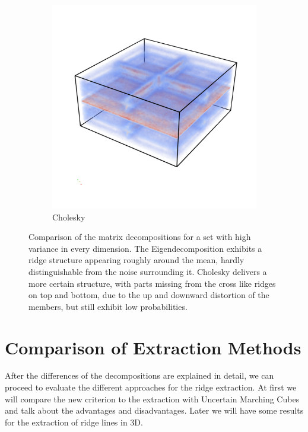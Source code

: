 \begin{figure}
\begin{subfigure}[b]{0.49\textwidth}
        \includegraphics[trim=0 350 0 300, clip=true, width=\textwidth]{Images/highuncChol.png}
        \caption{Cholesky}
        \label{fig:HUCchol}
    \end{subfigure}
    \caption{Comparison of the matrix decompositions for a set with high
    variance in every dimension. The Eigendecomposition exhibits a ridge
    structure appearing roughly around the mean, hardly distinguishable
    from the noise surrounding it. Cholesky delivers a more certain
    structure, with parts missing from the cross like ridges on top and
    bottom, due to the up and downward distortion of the members, but
    still exhibit low probabilities.}
    \label{fig:HUCcomp}
\end{figure}

\section{Comparison of Extraction Methods}\label{sec:evalExtr}

After the differences of the decompositions are explained in detail, we
can proceed to evaluate the different approaches for the ridge
extraction. At first we will compare the new criterion to the extraction
with Uncertain Marching Cubes and talk about the advantages and
disadvantages. Later we will have some results for the extraction of
ridge lines in 3D.

